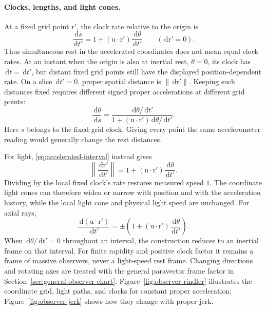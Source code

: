 \documentclass[11pt]{article}
\newcommand{\vstyle}[1]{{\bm{\mathrm{#1}}}}
\numberwithin{equation}{section}
\newcommand{\dotprod}{\cdot}
\newcommand{\br}{\vstyle{r}}
\newcommand{\bu}{\vstyle{u}}
\newcommand{\dd}{\,\mathrm d}
\begin{document}
\paragraph{Clocks, lengths, and light cones.}
At a fixed grid point $\br'$, the clock rate relative to the origin is
\[
 \boxed{\frac{\dd s}{\dd t'}
 =1+(\bu\dotprod\br')\frac{\dd\theta}{\dd t'}
 \qquad(\dd\br'=0).}
\]
Thus simultaneous rest in the accelerated coordinates does not mean equal
clock rates. At an instant when the origin is also at inertial rest,
$\theta=0$, its clock has $\dd t=\dd t'$, but distant fixed grid points
still have the displayed position-dependent rate.
On a slice $\dd t'=0$, proper spatial distance is $\lVert\dd\br'\rVert$.
Keeping such distances fixed requires different signed proper
accelerations at different grid points:
\[
 \frac{\dd\theta}{\dd s}
 =\frac{\dd\theta/\dd t'}
 {1+(\bu\dotprod\br')\dd\theta/\dd t'}.
\]
Here $s$ belongs to the fixed grid clock. Giving every point the same
accelerometer reading would generally change the rest distances.

For light, \eqref{eq:accelerated-interval} instead gives
\[
 \left\lVert\frac{\dd\br'}{\dd t'}\right\rVert
 =1+(\bu\dotprod\br')\frac{\dd\theta}{\dd t'}.
\]
Dividing by the local fixed clock's rate restores measured speed $1$.
The coordinate light cones can therefore widen or narrow with position
and with the acceleration history, while the local light cone and
physical light speed are unchanged. For axial rays,
\begin{equation}
 \frac{\dd(\bu\dotprod\br')}{\dd t'}
 =\pm\left(1+(\bu\dotprod\br')\frac{\dd\theta}{\dd t'}\right).
 \label{eq:accelerated-null-slopes}
\end{equation}
When $\dd\theta/\dd t'=0$ throughout an interval, the construction reduces
to an inertial frame on that interval. For finite rapidity and positive clock factor it
remains a frame of massive observers, never a light-speed rest frame.
Changing directions and rotating axes are treated with the general
paravector frame factor in Section~\ref{sec:general-observer-chart}.
Figure~\ref{fig:observer-rindler} illustrates the coordinate grid, light
paths, and clocks for constant proper acceleration;
Figure~\ref{fig:observer-jerk} shows how they change with proper jerk.
\end{document}
